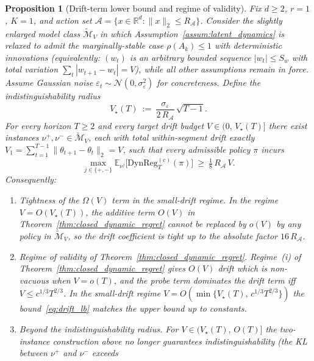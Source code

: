 \documentclass[11pt]{article}
\newcommand{\R}{\mathbb{R}}
\newcommand{\E}{\mathbb{E}}
\newcommand{\cA}{\mathcal{A}}
\newcommand{\DynReg}{\mathrm{DynReg}}
\newtheorem{proposition}{Proposition}
\begin{document}
\begin{proposition}[Drift-term lower bound and regime of validity]
\label{prop:drift_lb}
Fix $d\ge 2$, $r=1$, $K=1$, and action set
$\cA=\{x\in\R^d:\|x\|_2\le R_{\cA}\}$.
Consider the slightly enlarged model class $\widetilde{\mathcal M}_V$ in
which Assumption~\ref{assum:latent_dynamics} is relaxed to admit the
marginally-stable case $\rho(A_k)\le 1$ with deterministic innovations
(equivalently: $(w_t)$ is an arbitrary bounded sequence
$|w_t|\le S_w$ with total variation $\sum_t|w_{t+1}-w_t|=V$), while all
other assumptions remain in force.
Assume Gaussian noise
$\varepsilon_t\sim\mathcal N(0,\sigma_\varepsilon^2)$ for concreteness.
Define the \emph{indistinguishability radius}
\begin{equation}
  V_{\star}(T)\ :=\ \frac{\sigma_\varepsilon}{2\,R_{\cA}}\,\sqrt{T-1}.
  \label{eq:V_star}
\end{equation}
For every horizon $T\ge 2$ and every target drift budget
$V\in(0,\,V_\star(T)]$ there exist instances
$\nu^{+},\nu^{-}\in\widetilde{\mathcal M}_V$, each with total
within-segment drift exactly
$V_1=\sum_{t=1}^{T-1}\|\theta_{t+1}-\theta_t\|_2=V$, such that every
admissible policy $\pi$ incurs
\begin{equation}
\max_{j\in\{+,-\}}\E_{\nu^j}\bigl[\DynReg_T^{(c)}(\pi)\bigr]
\ \ge\ \tfrac{1}{8}\,R_{\cA}\,V.
\label{eq:drift_lb}
\end{equation}
Consequently:
\begin{enumerate}[leftmargin=*,itemsep=1pt]
\item \emph{Tightness of the $\Omega(V)$ term in the small-drift regime.}
  In the regime $V=O(V_\star(T))$, the additive term $O(V)$ in
  Theorem~\ref{thm:closed_dynamic_regret} cannot be replaced by $o(V)$ by any
  policy in $\widetilde{\mathcal M}_V$, so the drift coefficient is tight up to
  the absolute factor $16\,R_{\cA}$.
\item \emph{Regime of validity of Theorem~\ref{thm:closed_dynamic_regret}.}
  Regime~(i) of Theorem~\ref{thm:closed_dynamic_regret} gives $O(V)$ drift
  which is non-vacuous when $V=o(T)$, and the probe term dominates the drift
  term iff $V\le c^{1/3}T^{2/3}$.  In the small-drift regime
  $V=O(\min\{V_\star(T),\,c^{1/3}T^{2/3}\})$ the
  bound~\eqref{eq:drift_lb} matches the upper bound up to constants.
\item \emph{Beyond the indistinguishability radius.}
  For $V\in(V_\star(T),\,O(T)]$ the two-instance construction above no longer
  guarantees indistinguishability (the KL between $\nu^+$ and $\nu^-$ exceeds

\end{enumerate}
\end{proposition}
\end{document}

